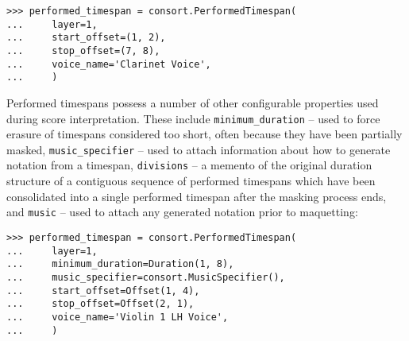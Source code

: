 \begin{comment}
<abjad>
performed_timespan = consort.PerformedTimespan(
    layer=1,
    start_offset=(1, 2),
    stop_offset=(7, 8),
    voice_name='Clarinet Voice',
    )
</abjad>
\end{comment}

\begin{singlespacing}
\vspace{-0.5\baselineskip}
\begin{lstlisting}
>>> performed_timespan = consort.PerformedTimespan(
...     layer=1,
...     start_offset=(1, 2),
...     stop_offset=(7, 8),
...     voice_name='Clarinet Voice',
...     )
\end{lstlisting}
\end{singlespacing}

\noindent Performed timespans possess a number of other configurable properties
used during score interpretation. These include \texttt{minimum\_duration} --
used to force erasure of timespans considered too short, often because they
have been partially masked, \texttt{music\_specifier} -- used to attach
information about how to generate notation from a timespan, \texttt{divisions}
-- a memento of the original duration structure of a contiguous sequence of
performed timespans which have been consolidated into a single performed
timespan after the masking process ends, and \texttt{music} -- used to attach
any generated notation prior to maquetting:

\begin{comment}
<abjad>
performed_timespan = consort.PerformedTimespan(
    layer=1,
    minimum_duration=Duration(1, 8),
    music_specifier=consort.MusicSpecifier(),
    start_offset=Offset(1, 4),
    stop_offset=Offset(2, 1),
    voice_name='Violin 1 LH Voice',
    )
</abjad>
\end{comment}

\begin{singlespacing}
\vspace{-0.5\baselineskip}
\begin{lstlisting}
>>> performed_timespan = consort.PerformedTimespan(
...     layer=1,
...     minimum_duration=Duration(1, 8),
...     music_specifier=consort.MusicSpecifier(),
...     start_offset=Offset(1, 4),
...     stop_offset=Offset(2, 1),
...     voice_name='Violin 1 LH Voice',
...     )
\end{lstlisting}
\end{singlespacing}

